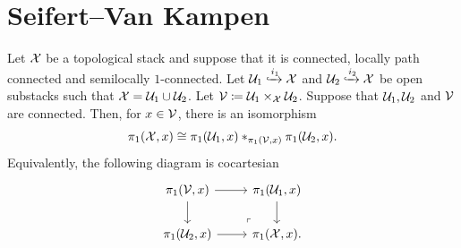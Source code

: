 \section{Seifert--Van Kampen}

\begin{thm}\label{van kampen}
Let $\mathcal{X}$ be a topological stack and suppose that it is connected, locally path connected and semilocally $1$-connected. Let $\mathcal{U}_1 \xhookrightarrow{i_1} \mathcal{X}$ and $\mathcal{U}_2 \xhookrightarrow{i_2} \mathcal{X}$ be open substacks such that $\mathcal{X} = \mathcal{U}_1 \cup \mathcal{U}_2$. Let $\mathcal{V} \coloneqq \mathcal{U}_1 \times_{\mathcal{X}} \mathcal{U}_2$. Suppose that $\mathcal{U}_1, \mathcal{U}_2$ and $\mathcal{V}$ are connected. Then, for $x \in \mathcal{V}$, there is an isomorphism
\[
\pi_1(\mathcal{X}, x) \cong \pi_1(\mathcal{U}_1, x) *_{\pi_1(\mathcal{V}, x)} \pi_1(\mathcal{U}_2, x).
\]
Equivalently, the following diagram is cocartesian
\[\begin{tikzcd}
	{{\pi_1(\mc{V}, x)}} & {\pi_1(\mc{U}_1, x)} \\
	{\pi_1(\mc{U}_2, x)} & {\pi_1(\mc{X}, x).}
	\arrow[from=1-1, to=1-2]
	\arrow[from=1-1, to=2-1]
	\arrow[from=1-2, to=2-2]
	\arrow[from=2-1, to=2-2]
	\arrow["\lrcorner"{anchor=center, pos=0.125, rotate=180}, draw=none, from=2-2, to=1-1]
\end{tikzcd}\]
\end{thm}

